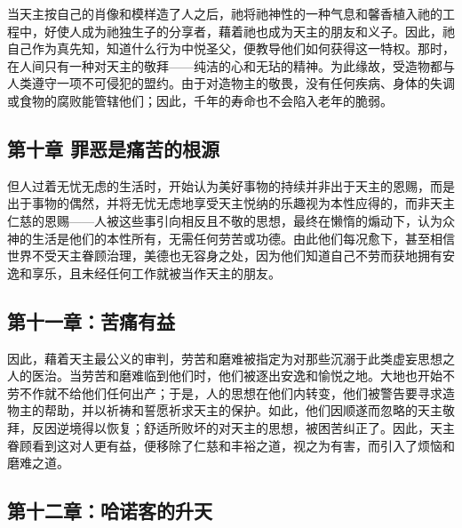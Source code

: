 当天主按自己的肖像和模样造了人之后，祂将祂神性的一种气息和馨香植入祂的工程中，好使人成为祂独生子的分享者，藉着祂也成为天主的朋友和义子。因此，祂自己作为真先知，知道什么行为中悦圣父，便教导他们如何获得这一特权。那时，在人间只有一种对天主的敬拜——纯洁的心和无玷的精神。为此缘故，受造物都与人类遵守一项不可侵犯的盟约。由于对造物主的敬畏，没有任何疾病、身体的失调或食物的腐败能管辖他们；因此，千年的寿命也不会陷入老年的脆弱。\par


\subsection{第十章 罪恶是痛苦的根源}

但人过着无忧无虑的生活时，开始认为美好事物的持续并非出于天主的恩赐，而是出于事物的偶然，并将无忧无虑地享受天主悦纳的乐趣视为本性应得的，而非天主仁慈的恩赐——人被这些事引向相反且不敬的思想，最终在懒惰的煽动下，认为众神的生活是他们的本性所有，无需任何劳苦或功德。由此他们每况愈下，甚至相信世界不受天主眷顾治理，美德也无容身之处，因为他们知道自己不劳而获地拥有安逸和享乐，且未经任何工作就被当作天主的朋友。\par


\subsection{第十一章：苦痛有益}

因此，藉着天主最公义的审判，劳苦和磨难被指定为对那些沉溺于此类虚妄思想之人的医治。当劳苦和磨难临到他们时，他们被逐出安逸和愉悦之地。大地也开始不劳不作就不给他们任何出产；于是，人的思想在他们内转变，他们被警告要寻求造物主的帮助，并以祈祷和誓愿祈求天主的保护。如此，他们因顺遂而忽略的天主敬拜，反因逆境得以恢复；舒适所败坏的对天主的思想，被困苦纠正了。因此，天主眷顾看到这对人更有益，便移除了仁慈和丰裕之道，视之为有害，而引入了烦恼和磨难之道。\par


\subsection{第十二章：哈诺客的升天}

